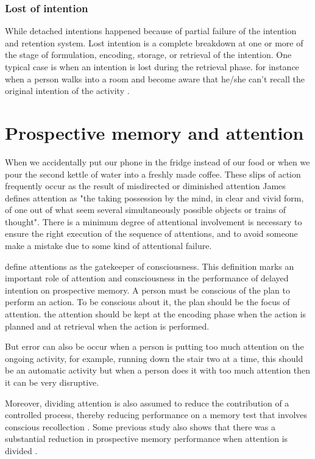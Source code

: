 \subsubsection{Lost of intention}

While detached intentions happened because of partial failure of the intention and retention system. Lost intention
is a complete breakdown at one or more of the stage of formulation, encoding, storage, or retrieval of the intention.
One typical case is when an intention is lost during the retrieval phase. for instance when a person walks into a room and become aware that he/she can't recall the original intention of the activity \citep{Reason1984}.


\section{Prospective memory and attention}


When we accidentally put our phone in the fridge instead of our food or when we pour the second kettle of water into a freshly made coffee. These slips of action frequently occur as the result of misdirected or diminished attention \cite{Reason1984}
James defines attention as  "the taking possession by the mind, in clear and vivid form, of one out of what seem several simultaneously possible objects or trains of thought".
There is a minimum degree of attentional involvement is necessary to ensure the right execution of the sequence of attentions, and to avoid someone make a mistake due to some kind of attentional failure.

\cite{Reason1984} define attentions as the gatekeeper of consciousness. This definition marks an important role of attention and consciousness in the performance of delayed intention on prospective memory. A person must be conscious of the plan to perform an action. To be conscious about it, the plan should be the focus of attention. the attention should be kept at the encoding phase when the action is planned and at retrieval when the action is performed.

But error can also be occur when a person is putting too much attention on the ongoing activity, for example, running down the stair two at a time, this should be an automatic activity but when a person does it with too much attention then it can be very disruptive.

Moreover, dividing attention is also assumed to reduce the contribution of a controlled process, thereby
reducing performance on a memory test that involves conscious recollection \citep{Jacoby1989}.
Some previous study also shows that there was a substantial reduction in prospective memory performance when attention is divided \citep{McDaniel1998}
\citep{10.1371/journal.pone.0074447}.



